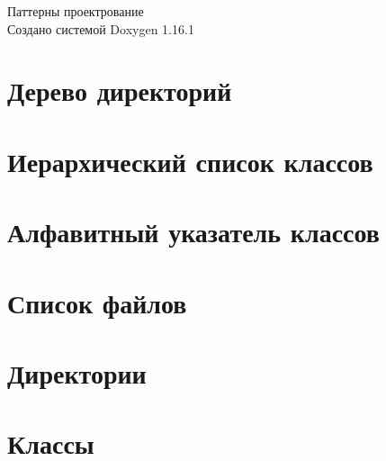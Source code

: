 \documentclass[twoside]{book}
\newcommand{\+}{\discretionary{\mbox{\scriptsize$\hookleftarrow$}}{}{}}
\newcommand{\clearemptydoublepage}{%
    \newpage{\pagestyle{empty}\cleardoublepage}%
  }
\begin{document}
  \raggedbottom
    \hypersetup{pageanchor=false,
                bookmarksnumbered=true,
                pdfencoding=unicode
               }
  \begin{titlepage}
  \vspace*{7cm}
  \begin{center}%
  {\Large Паттерны проектрование}\\
  \vspace*{1cm}
  {\large Создано системой Doxygen 1.16.1}\\
  \end{center}
  \end{titlepage}
  \clearemptydoublepage
  \tableofcontents
  \clearemptydoublepage
  \hypersetup{pageanchor=true}

\chapter{Дерево директорий}

\chapter{Иерархический список классов}

\chapter{Алфавитный указатель классов}

\chapter{Список файлов}

\chapter{Директории}











\chapter{Классы}






















\end{document}
